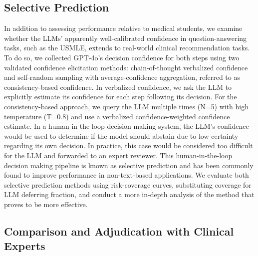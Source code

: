 \subsection{Selective Prediction}

In addition to assessing performance relative to medical students, we examine whether the LLMs' apparently well-calibrated confidence in question-answering tasks, such as the USMLE, extends to real-world clinical recommendation tasks\cite{singhalLargeLanguageModels2023}. To do so, we collected GPT-4o's decision confidence for both steps using two validated confidence elicitation methods: chain-of-thought verbalized confidence and self-random sampling with average-confidence aggregation, referred to as consistency-based confidence\cite{xiongCanLLMsExpress2023}. In verbalized confidence, we ask the LLM to explicitly estimate its confidence for each step following its decision. For the consistency-based approach, we query the LLM multiple times (N=5) with high temperature (T=0.8) and use a verbalized confidence-weighted confidence estimate. In a human-in-the-loop decision making system, the LLM's confidence would be used to determine if the model should abstain due to low certainty regarding its own decision. In practice, this case would be considered too difficult for the LLM and forwarded to an expert reviewer. This human-in-the-loop decision making pipeline is known as selective prediction and has been commonly found to improve performance in non-text-based applications\cite{leibigLeveragingUncertaintyInformation2017, chuaTacklingPredictionUncertainty2023}. We evaluate both selective prediction methods using risk-coverage curves\cite{geifmanSelectiveClassificationDeep2017, el-yanivFoundationsNoisefreeSelective2010}, substituting coverage for LLM deferring fraction, and conduct a more in-depth analysis of the method that proves to be more effective.

\subsection{Comparison and Adjudication with Clinical Experts}

